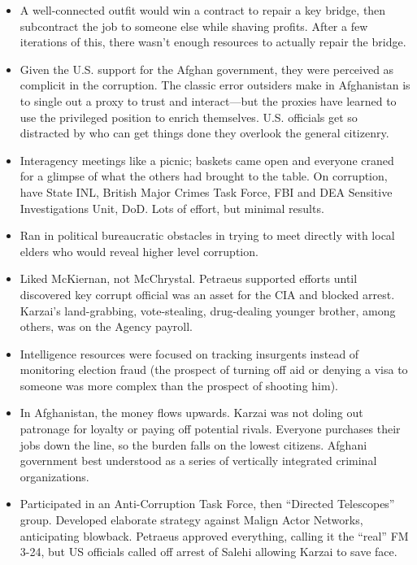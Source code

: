 \documentclass[
]{article}
\begin{document}
\begin{itemize}
\item
  A well-connected outfit would win a contract to repair a key bridge,
  then subcontract the job to someone else while shaving profits. After
  a few iterations of this, there wasn't enough resources to actually
  repair the bridge.
\item
  Given the U.S. support for the Afghan government, they were perceived
  as complicit in the corruption. The classic error outsiders make in
  Afghanistan is to single out a proxy to trust and interact---but the
  proxies have learned to use the privileged position to enrich
  themselves. U.S. officials get so distracted by who can get things
  done they overlook the general citizenry.
\item
  Interagency meetings like a picnic; baskets came open and everyone
  craned for a glimpse of what the others had brought to the table. On
  corruption, have State INL, British Major Crimes Task Force, FBI and
  DEA Sensitive Investigations Unit, DoD. Lots of effort, but minimal
  results.
\item
  Ran in political bureaucratic obstacles in trying to meet directly
  with local elders who would reveal higher level corruption.
\item
  Liked McKiernan, not McChrystal. Petraeus supported efforts until
  discovered key corrupt official was an asset for the CIA and blocked
  arrest. Karzai's land-grabbing, vote-stealing, drug-dealing younger
  brother, among others, was on the Agency payroll.
\item
  Intelligence resources were focused on tracking insurgents instead of
  monitoring election fraud (the prospect of turning off aid or denying
  a visa to someone was more complex than the prospect of shooting him).
\item
  In Afghanistan, the money flows upwards. Karzai was not doling out
  patronage for loyalty or paying off potential rivals. Everyone
  purchases their jobs down the line, so the burden falls on the lowest
  citizens. Afghani government best understood as a series of vertically
  integrated criminal organizations.
\item
  Participated in an Anti-Corruption Task Force, then ``Directed
  Telescopes'' group. Developed elaborate strategy against Malign Actor
  Networks, anticipating blowback. Petraeus approved everything, calling
  it the ``real'' FM 3-24, but US officials called off arrest of Salehi
  allowing Karzai to save face.
\end{itemize}
\end{document}
